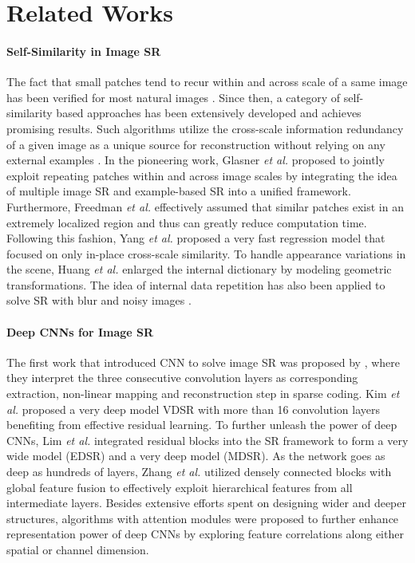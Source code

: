 \documentclass[10pt,twocolumn,letterpaper]{article}
\begin{document}
\section{Related Works}


\paragraph{Self-Similarity in Image SR}
The fact that small patches tend to recur within and across scale of a same image has been verified for most natural images \cite{glasner2009super, zontak2011internal}. Since then, a category of self-similarity based approaches has been extensively developed and achieves promising results. Such algorithms utilize the cross-scale information redundancy of a given image as a unique source for reconstruction without relying on any external examples \cite{freedman2011image,freeman2002example,glasner2009super,huang2015single,michaeli2013nonparametric,singh2014super,yang2013fast}. In the pioneering work, Glasner \textit{et al.} \cite{glasner2009super} proposed to jointly exploit repeating patches within and across image scales by integrating the idea of multiple image SR and example-based SR into a unified framework. Furthermore, Freedman \textit{et al.} \cite{freedman2011image} effectively assumed that similar patches exist in an extremely localized region and thus can greatly reduce computation time. Following this fashion, Yang \textit{et al.} \cite{yang2013fast} proposed a very fast regression model that focused on only in-place cross-scale similarity. To handle appearance variations in the scene, Huang \textit{et al.} \cite{huang2015single} enlarged the internal dictionary by modeling geometric transformations. The idea of internal data repetition has also been applied to solve SR with blur and noisy images \cite{michaeli2013nonparametric,singh2014super}.

\paragraph{Deep CNNs for Image SR} 

The first work that introduced CNN to solve image SR was proposed by \cite{dong2014learning}, where they interpret the three consecutive convolution layers as corresponding extraction, non-linear mapping and reconstruction step in sparse coding. Kim \textit{et al.} \cite{kim2016accurate} proposed a very deep model VDSR with more than 16 convolution layers benefiting from effective residual learning. To further unleash the power of deep CNNs, Lim \textit{et al.} \cite{lim2017enhanced} integrated residual blocks into the SR framework to form a very wide model (EDSR) and a very deep model (MDSR). As the network goes as deep as hundreds of layers, Zhang \textit{et al.} \cite{zhang2018residual} utilized densely connected blocks with global feature fusion to effectively exploit hierarchical features from all intermediate layers. Besides extensive efforts spent on designing wider and deeper structures, algorithms with attention modules \cite{dai2019second,liu2018non,zhang2018image,zhang2019residual} were proposed to further enhance representation power of deep CNNs by exploring feature correlations along either spatial or channel dimension. 
\end{document}
